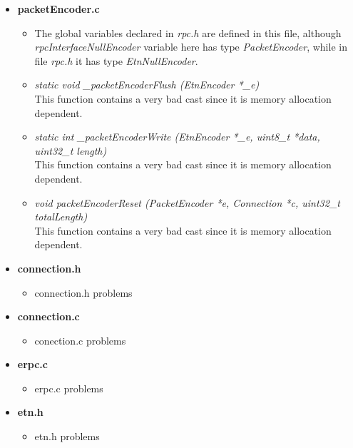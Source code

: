 \begin{itemize}
\item \textbf{packetEncoder.c}
\begin{itemize}
\item The global variables declared in \emph{rpc.h} are defined in this file, although \emph{rpcInterfaceNullEncoder} variable here has type \emph{PacketEncoder}, while in file \emph{rpc.h} it has type \emph{EtnNullEncoder}.

\item \emph{static void \_packetEncoderFlush (EtnEncoder *\_e)}\\
This function contains a very bad cast since it is memory allocation dependent.

\item \emph{static int \_packetEncoderWrite (EtnEncoder *\_e, uint8\_t *data, uint32\_t length)}\\
This function contains a very bad cast since it is memory allocation dependent.
\item \emph{void packetEncoderReset (PacketEncoder *e, Connection *c, uint32\_t totalLength)}\\
This function contains a very bad cast since it is memory allocation dependent.
\end{itemize}

\item \textbf{connection.h}
\begin{itemize}
\item connection.h problems
\end{itemize}

\item \textbf{connection.c}
\begin{itemize}
\item conection.c problems
\end{itemize}

\item \textbf{erpc.c}
\begin{itemize}
\item erpc.c problems
\end{itemize}

\item \textbf{etn.h}
\begin{itemize}
\item etn.h problems
\end{itemize}

\end{itemize}